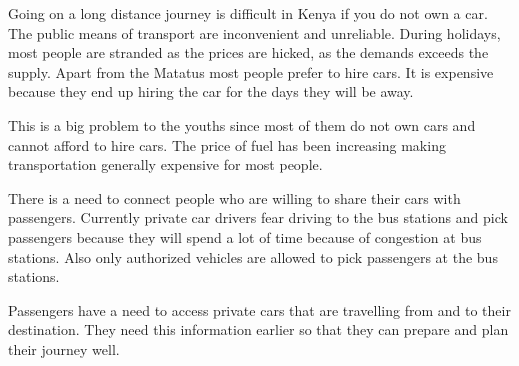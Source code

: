 Going on a long distance journey is difficult in Kenya if you do not own a car. The public means of transport are inconvenient and unreliable. During holidays, most people are stranded as the prices are hicked, as the demands exceeds the supply. Apart from the Matatus most people prefer to hire cars. It is expensive because they end up hiring the car for the days they will be away.

This is a big problem to the youths since most of them do not own cars and cannot afford to hire cars. The price of fuel has been increasing making transportation generally expensive for most people.

There is a need to connect people who are willing to share their cars with passengers. Currently private car drivers fear driving to the bus stations and pick passengers because they will spend a lot of time because of congestion at bus stations. Also only authorized vehicles are allowed to pick passengers at the bus stations.

Passengers have a need to access private cars that are travelling from and to their destination. They need this information earlier so that they can prepare and plan their journey well.